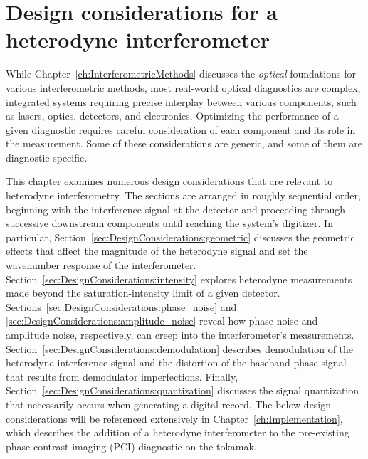 \chapter{Design considerations for a heterodyne interferometer}
\label{ch:DesignConsiderations}
While Chapter~\ref{ch:InterferometricMethods} discusses the
\emph{optical} foundations for various interferometric methods,
most real-world optical diagnostics are complex, integrated systems
requiring precise interplay between various components, such as
lasers, optics, detectors, and electronics.
Optimizing the performance of a given diagnostic
requires careful consideration
of each component and its role in the measurement.
Some of these considerations are generic, and
some of them are diagnostic specific.

This chapter examines numerous design considerations
that are relevant to heterodyne interferometry.
The sections are arranged in roughly sequential order,
beginning with the interference signal at the detector and
proceeding through successive downstream components
until reaching the system's digitizer.
In particular, Section~\ref{sec:DesignConsiderations:geometric}
discusses the geometric effects that
affect the magnitude of the heterodyne signal and
set the wavenumber response of the interferometer.
Section~\ref{sec:DesignConsiderations:intensity}
explores heterodyne measurements made
beyond the saturation-intensity limit of a given detector.
Sections~\ref{sec:DesignConsiderations:phase_noise} and
\ref{sec:DesignConsiderations:amplitude_noise}
reveal how phase noise and amplitude noise, respectively,
can creep into the interferometer's measurements.
Section~\ref{sec:DesignConsiderations:demodulation}
describes demodulation of the heterodyne interference signal and
the distortion of the baseband phase signal
that results from demodulator imperfections.
Finally, Section~\ref{sec:DesignConsiderations:quantization}
discusses the signal quantization
that necessarily occurs
when generating a digital record.
The below design considerations will be referenced extensively in
Chapter~\ref{ch:Implementation}, which
describes the addition of a heterodyne interferometer
to the pre-existing phase contrast imaging (PCI) diagnostic
on the \diiid\space tokamak.


